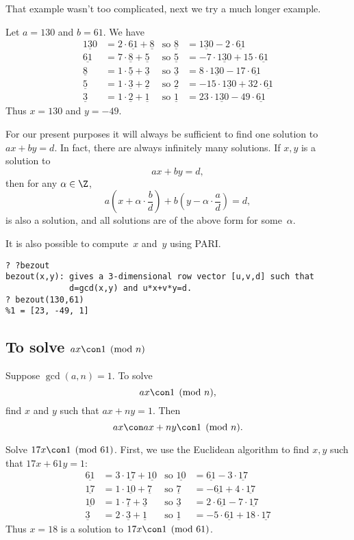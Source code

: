 \documentclass[11pt]{report}
\newcommand{\ul}[1]{\underline{#1}}
\begin{document}
That example wasn't too complicated, next we try a much longer example.
\begin{example}
  Let $a=130$ and $b=61$.  We have
  \begin{align*}
    \ul{130} & = 2\cdot \ul{61} + \ul{8} & \text{so } \ul{8} & = \ul{130}-2\cdot\ul{61}         \\
    \ul{61}  & = 7\cdot \ul{8} + \ul{5}  & \text{so } \ul{5} & = -7\cdot\ul{130}+15\cdot\ul{61} \\
    \ul{8}   & = 1\cdot \ul{5} + \ul{3}  & \text{so } \ul{3} & = 8\cdot\ul{130}-17\cdot\ul{61}  \\
    \ul{5}   & = 1\cdot \ul{3} + \ul{2}  & \text{so } \ul{2} & =-15\cdot\ul{130}+32\cdot\ul{61} \\
    \ul{3}   & = 1\cdot \ul{2} + \ul{1}  & \text{so } \ul{1} & = 23\cdot\ul{130}-49\cdot\ul{61}
  \end{align*}
  Thus $x=130$ and $y=-49$.
\end{example}

\begin{remark}
  For our present purposes it will always be sufficient to find one
  solution to $ax+by=d$.  In fact, there are always
  infinitely many solutions.  If $x, y$ is a solution to
  $$
    ax + by = d,
  $$
  then for any $\alpha\in\Z$,
  $$
    a\left(x+\alpha\cdot\frac{b}{d}\right) + b\left(y - \alpha\cdot\frac{a}{d}\right) = d,
  $$
  is also a solution, and all
  solutions are of the above form for some~$\alpha$.
\end{remark}

It is also possible to compute~$x$ and~$y$ using PARI.
\begin{verbatim}
? ?bezout
bezout(x,y): gives a 3-dimensional row vector [u,v,d] such that 
             d=gcd(x,y) and u*x+v*y=d.
? bezout(130,61)
%1 = [23, -49, 1]
\end{verbatim}


\subsection{To solve $ax\con 1\pmod{n}$}
Suppose $\gcd(a,n)=1$.  To solve
$$
  ax\con 1\pmod{n},
$$
find $x$ and $y$ such that
$ax+ny = 1$.  Then
$$
  ax \con ax + ny \con 1 \pmod{n}.
$$

\begin{example}
  Solve $17x \con 1\pmod{61}$.
  First, we use the Euclidean algorithm to find $x, y$ such that
  $17x+61y=1$:
  \begin{align*}
    \ul{61} & =3\cdot\ul{17}+\ul{10} & \text{so }\ul{10} & =\ul{61} - 3\cdot\ul{17}       \\
    \ul{17} & =1\cdot\ul{10}+\ul{7}  & \text{so }\ul{7}  & =-\ul{61} + 4\cdot\ul{17}      \\
    \ul{10} & =1\cdot \ul{7}+\ul{3}  & \text{so }\ul{3}  & =2\cdot\ul{61} - 7\cdot\ul{17} \\
    \ul{3}  & =2\cdot\ul{3} +\ul{1}  & \text{so }\ul{1}  & =-5\cdot\ul{61}+18\cdot\ul{17}
  \end{align*}
  Thus $x=18$ is a solution to $17x \con 1\pmod{61}$.
\end{example}
\end{document}
